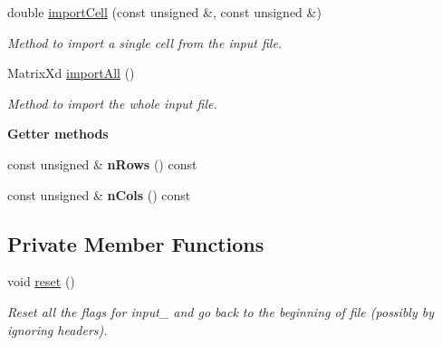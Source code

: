 \begin{DoxyCompactItemize}
double \hyperlink{classCsvParser_aaa5332e0ec78d1f38dd54240dcc728fe}{import\-Cell} (const unsigned \&, const unsigned \&)
\begin{DoxyCompactList}\small\item\em Method to import a single cell from the input file. \end{DoxyCompactList}\item 
Matrix\-Xd \hyperlink{classCsvParser_af4d7e0e1fe650b836e87387962297e86}{import\-All} ()
\begin{DoxyCompactList}\small\item\em Method to import the whole input file. \end{DoxyCompactList}\end{DoxyCompactItemize}
\begin{Indent}{\bf Getter methods}\par
\begin{DoxyCompactItemize}
\item 
\hypertarget{classCsvParser_a97cc0c0da2b3691103450622dda2519a}{const unsigned \& {\bfseries n\-Rows} () const }\label{classCsvParser_a97cc0c0da2b3691103450622dda2519a}

\item 
\hypertarget{classCsvParser_a5de88cc09cb45066e7b6396b24d68a19}{const unsigned \& {\bfseries n\-Cols} () const }\label{classCsvParser_a5de88cc09cb45066e7b6396b24d68a19}

\end{DoxyCompactItemize}
\end{Indent}
\subsection*{Private Member Functions}
\begin{DoxyCompactItemize}
\item 
\hypertarget{classCsvParser_ad20897c5c8bd47f5d4005989bead0e55}{void \hyperlink{classCsvParser_ad20897c5c8bd47f5d4005989bead0e55}{reset} ()}\label{classCsvParser_ad20897c5c8bd47f5d4005989bead0e55}

\begin{DoxyCompactList}\small\item\em Reset all the flags for {\itshape input\-\_\-} and go back to the beginning of file (possibly by ignoring headers). \end{DoxyCompactList}\end{DoxyCompactItemize}
